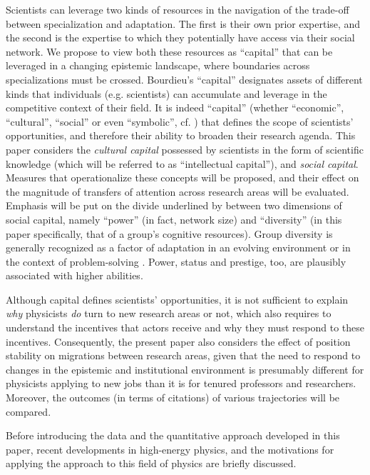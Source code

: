 \documentclass{article}
\begin{document}
Scientists can leverage two kinds of resources in the navigation of the trade-off between specialization and adaptation. The first is their own prior expertise, and the second is the expertise to which they potentially have access via their social network. We propose to view both these resources as ``capital'' \citep{Bourdieu1986} that can be leveraged in a changing epistemic landscape, where boundaries across specializations must be crossed. Bourdieu's ``capital'' designates assets of different kinds that individuals (e.g. scientists) can accumulate and leverage in the competitive context of their field. It is indeed ``capital''  (whether ``economic'', ``cultural'', ``social'' or even ``symbolic'', cf. \citealt{Bourdieu1986}) that defines the scope of scientists' opportunities, and therefore their ability to broaden their research agenda. This paper considers the \textit{cultural capital} possessed by scientists in the form of scientific knowledge (which will be referred to as ``intellectual capital''), and \textit{social capital}. Measures that operationalize these concepts will be proposed, and their effect on the magnitude of transfers of attention across research areas will be evaluated. Emphasis will be put on the divide underlined by \citet{Abbasi2014} between two dimensions of social capital, namely ``power'' (in fact, network size) and ``diversity'' (in this paper specifically, that of a group's cognitive resources). Group diversity is generally recognized as a factor of adaptation in an evolving environment \citep{Schimmelpfennig2021,Muthukrishna2016,Henrich2004} or in the context of problem-solving \citep{Hong2004}. Power, status and prestige, too, are plausibly associated with higher abilities.

Although capital defines scientists' opportunities, it is not sufficient to explain \textit{why} physicists \textit{do} turn to new research areas or not, which also requires to understand the incentives that actors receive and why they must respond to these incentives. Consequently, the present paper also considers the effect of position stability on migrations between research areas, given that the need to respond to changes in the epistemic and institutional environment is presumably different for physicists applying to new jobs than it is for tenured professors and researchers. Moreover, the outcomes (in terms of citations) of various trajectories will be compared.

Before introducing the data and the quantitative approach developed in this paper, recent developments in high-energy physics, and the motivations for applying the approach to this field of physics are briefly discussed. 
\end{document}
